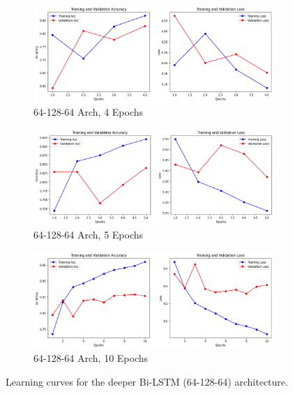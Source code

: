 \documentclass[11pt]{article}
\begin{document}
\begin{figure}[htbp]
  \centering
  \begin{subfigure}{0.3\textwidth}
    \includegraphics[width=\linewidth]{figs/4_3.png}
    \caption{64-128-64 Arch, 4 Epochs}
    \label{fig:lstm-64-128-64-4e}
  \end{subfigure}
  \hfill
  \begin{subfigure}{0.3\textwidth}
    \includegraphics[width=\linewidth]{figs/5_3.png}
    \caption{64-128-64 Arch, 5 Epochs}
    \label{fig:lstm-64-128-64-5e}
  \end{subfigure}
  \hfill
  \begin{subfigure}{0.3\textwidth}
    \includegraphics[width=\linewidth]{figs/10_3.png}
    \caption{64-128-64 Arch, 10 Epochs}
    \label{fig:lstm-64-128-64-10e}
  \end{subfigure}
  \caption{Learning curves for the deeper Bi-LSTM (64-128-64) architecture.}
  \label{fig:lstm-64-128-64-curves}
\end{figure}
\end{document}
